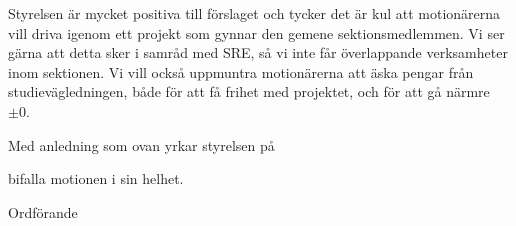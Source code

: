 \documentclass[../_main/handlingar.tex]{subfiles}
\begin{document}
\motionssvar

Styrelsen är mycket positiva till förslaget och tycker det är kul att motionärerna vill driva igenom ett projekt som gynnar den gemene sektionsmedlemmen. Vi ser gärna att detta sker i samråd med SRE, så vi inte får överlappande verksamheter inom sektionen. Vi vill också uppmuntra motionärerna att äska pengar från studievägledningen, både för att få frihet med projektet, och för att gå närmre $\pm 0$.

Med anledning som ovan yrkar styrelsen på
\begin{attsatser}
    \att bifalla motionen i sin helhet.
\end{attsatser}

\begin{signatures}{1}
    \ist
    \signature{Erik Månsson}{Ordförande}
\end{signatures}
\end{document}
